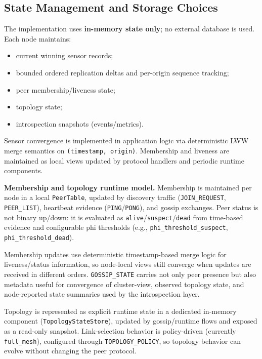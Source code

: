 \subsection{State Management and Storage Choices}
\label{implementation-storage}

The implementation uses \textbf{in-memory state only}; no external database is used. Each node maintains:
\begin{itemize}
  \item current winning sensor records;
  \item bounded ordered replication deltas and per-origin sequence tracking;
  \item peer membership/liveness state;
  \item topology state;
  \item introspection snapshots (events/metrics).
\end{itemize}

Sensor convergence is implemented in application logic via deterministic LWW merge semantics on \texttt{(timestamp, origin)}. Membership and liveness are maintained as local views updated by protocol handlers and periodic runtime components.

\textbf{Membership and topology runtime model.}
Membership is maintained per node in a local \texttt{PeerTable}, updated by discovery traffic (\texttt{JOIN\_REQUEST}, \texttt{PEER\_LIST}), heartbeat evidence (\texttt{PING}/\texttt{PONG}), and gossip exchanges. Peer status is not binary up/down: it is evaluated as \texttt{alive}/\texttt{suspect}/\texttt{dead} from time-based evidence and configurable phi thresholds (e.g., \texttt{phi\_threshold\_suspect}, \texttt{phi\_threshold\_dead}).

Membership updates use deterministic timestamp-based merge logic for liveness/status information, so node-local views still converge when updates are received in different orders. \texttt{GOSSIP\_STATE} carries not only peer presence but also metadata useful for convergence of cluster-view, observed topology state, and node-reported state summaries used by the introspection layer.

Topology is represented as explicit runtime state in a dedicated in-memory component (\texttt{TopologyStateStore}), updated by gossip/runtime flows and exposed as a read-only snapshot. Link-selection behavior is policy-driven (currently \texttt{full\_mesh}), configured through \texttt{TOPOLOGY\_POLICY}, so topology behavior can evolve without changing the peer protocol.

